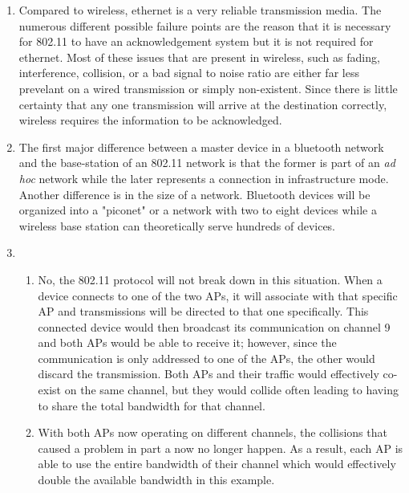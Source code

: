 


\begin{enumerate}
    \item Compared to wireless, ethernet is a very reliable transmission media. The numerous different possible failure points are the reason that it is necessary for 802.11 to have an acknowledgement system but it is not required for ethernet. Most of these issues that are present in wireless, such as fading, interference, collision, or a bad signal to noise ratio are either far less prevelant on a wired transmission or simply non-existent. Since there is little certainty that any one transmission will arrive at the destination correctly, wireless requires the information to be acknowledged.

    \item The first major difference between a master device in a bluetooth network and the base-station of an 802.11 network is that the former is part of an \textit{ad hoc} network while the later represents a connection in infrastructure mode. Another difference is in the size of a network. Bluetooth devices will be organized into a "piconet" or a network with two to eight devices while a wireless base station can theoretically serve hundreds of devices.

    \item \begin{enumerate}
        \item No, the 802.11 protocol will not break down in this situation. When a device connects to one of the two APs, it will associate with that specific AP and transmissions will be directed to that one specifically. This connected device would then broadcast its communication on channel 9 and both APs would be able to receive it; however, since the communication is only addressed to one of the APs, the other would discard the transmission. Both APs and their traffic would effectively co-exist on the same channel, but they would collide often leading to having to share the total bandwidth for that channel.

        \item With both APs now operating on different channels, the collisions that caused a problem in part a now no longer happen. As a result, each AP is able to use the entire bandwidth of their channel which would effectively double the available bandwidth in this example.
    \end{enumerate}


\end{enumerate}

